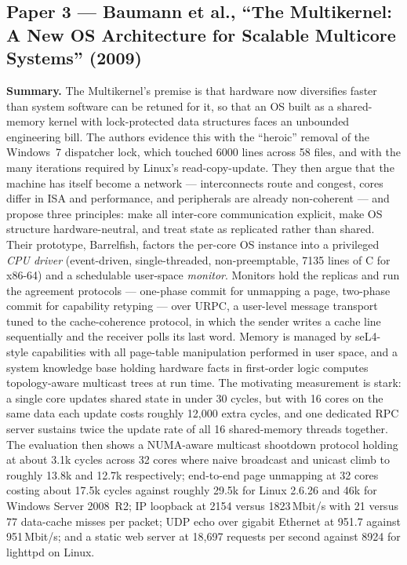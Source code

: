 \subsection*{Paper 3 --- Baumann et al., ``The Multikernel: A New OS Architecture for Scalable Multicore Systems'' (2009)}
\label{p4:sec:multikernel}

\textbf{Summary.} The Multikernel's premise is that hardware now diversifies faster than
system software can be retuned for it, so that an OS built as a shared-memory kernel with
lock-protected data structures faces an unbounded engineering bill. The authors evidence this
with the ``heroic'' removal of the Windows~7 dispatcher lock, which touched 6000 lines across
58 files, and with the many iterations required by Linux's read-copy-update. They then argue
that the machine has itself become a network --- interconnects route and congest, cores
differ in ISA and performance, and peripherals are already non-coherent --- and propose three
principles: make all inter-core communication explicit, make OS structure hardware-neutral,
and treat state as replicated rather than shared. Their prototype, Barrelfish, factors the
per-core OS instance into a privileged \emph{CPU driver} (event-driven, single-threaded,
non-preemptable, 7135 lines of C for x86-64) and a schedulable user-space \emph{monitor}.
Monitors hold the replicas and run the agreement protocols --- one-phase commit for unmapping
a page, two-phase commit for capability retyping --- over URPC, a user-level message
transport tuned to the cache-coherence protocol, in which the sender writes a cache line
sequentially and the receiver polls its last word. Memory is managed by seL4-style
capabilities with all page-table manipulation performed in user space, and a system knowledge
base holding hardware facts in first-order logic computes topology-aware multicast trees at
run time. The motivating measurement is stark: a single core updates shared state in under 30
cycles, but with 16 cores on the same data each update costs roughly 12{,}000 extra cycles,
and one dedicated RPC server sustains twice the update rate of all 16 shared-memory threads
together. The evaluation then shows a NUMA-aware multicast shootdown protocol holding at
about 3.1k cycles across 32 cores where naive broadcast and unicast climb to roughly 13.8k
and 12.7k respectively;
end-to-end page unmapping at 32 cores costing about 17.5k cycles against roughly 29.5k for
Linux 2.6.26 and 46k for Windows Server 2008~R2; IP loopback at 2154 versus 1823\,Mbit/s with 21
versus 77 data-cache misses per packet; UDP echo over gigabit Ethernet at 951.7 against
951\,Mbit/s; and a static web server at 18{,}697 requests per second against 8924 for
lighttpd on Linux.

